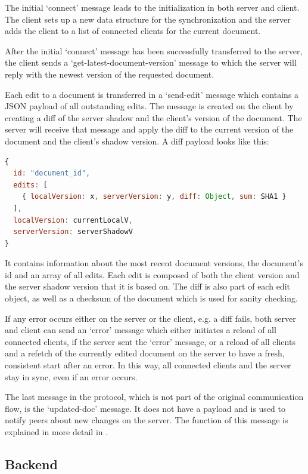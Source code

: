 The initial `connect' message leads to the initialization in both server and client. The client sets up a new data structure for the synchronization and the server adds the client to a list of connected clients for the current document.

After the initial `connect' message has been successfully transferred to the server, the client sends a `get-latest-document-version' message to which the server will reply with the newest version of the requested document.

Each edit to a document is transferred in a `send-edit' message which contains a JSON payload of all outstanding edits. The message is created on the client by creating a diff of the server shadow and the client's version of the document. The server will receive that message and apply the diff to the current version of the document and the client's shadow version. A diff payload looks like this:

\begin{lstlisting}[language=JavaScript, caption=Edit Payload, label=lst:edit-payload]
{
  id: "document_id",
  edits: [
    { localVersion: x, serverVersion: y, diff: Object, sum: SHA1 }
  ],
  localVersion: currentLocalV,
  serverVersion: serverShadowV
}
\end{lstlisting}

It contains information about the most recent document versions, the document's id and an array of all edits. Each edit is composed of both the client version and the server shadow version that it is based on. The diff is also part of each edit object, as well as a checksum of the document which is used for sanity checking.

If any error occurs either on the server or the client, e.g. a diff fails, both server and client can send an `error' message which either initiates a reload of all connected clients, if the server sent the `error' message, or a reload of all clients and a refetch of the currently edited document on the server to have a fresh, consistent start after an error. In this way, all connected clients and the server stay in sync, even if an error occurs.

The last message in the protocol, which is not part of the original communication flow, is the `updated-doc' message. It does not have a payload and is used to notify peers about new changes on the server. The function of this message is explained in more detail in .

\subsection{Backend}

